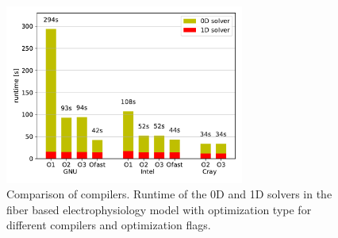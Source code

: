 \begin{figure}
  \centering%
  \includegraphics[width=0.7\textwidth]{images/results/studies/compilers.pdf}%
  \caption{Comparison of compilers. Runtime of the 0D and 1D solvers in the fiber based electrophysiology model with  optimization type for different compilers and optimization flags.}%
  \label{fig:compilers}%
\end{figure}%


